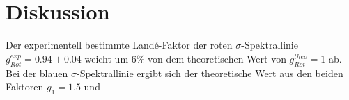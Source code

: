 \section{Diskussion}
\label{sec:Diskussion}
Der experimentell bestimmte Landé-Faktor der roten $\sigma$-Spektrallinie $g_{Rot}^{exp} = 0.94 \pm 0.04$ weicht um 6\% von dem theoretischen Wert von  $g_{Rot}^{theo} = 1$ ab.
Bei der blauen $\sigma$-Spektrallinie ergibt sich der theoretische Wert aus den beiden Faktoren $g_1=1.5$ und 

